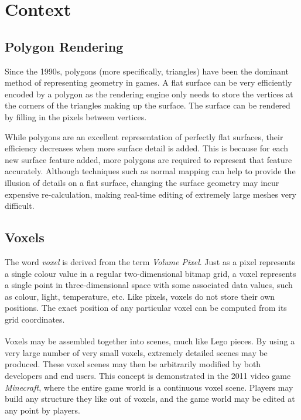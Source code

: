 \section{Context}
\subsection{Polygon Rendering}
Since the 1990s, polygons (more specifically, triangles) have been the dominant method of
representing geometry in games. A flat surface can be very efficiently
encoded by a polygon as the rendering engine only needs to store the vertices at the 
corners of the triangles making up the surface. The surface can be rendered by filling in
the pixels between vertices.

While polygons are an excellent representation of perfectly flat surfaces, their 
efficiency decreases when more surface detail is added. This is because for each new
surface feature added, more polygons are required to represent that feature accurately. 
Although techniques such as normal mapping can help to provide the illusion of details on
a flat surface, changing the surface geometry may incur expensive re-calculation, making real-time editing of extremely large meshes very difficult.

\subsection{Voxels}
The word \textit{voxel} is derived from the term \textit{Volume Pixel}. Just as a
pixel represents a single colour value in a regular two-dimensional bitmap grid, a 
voxel represents a single point in three-dimensional space with some associated data 
values, such as colour, light, temperature, etc. Like pixels, voxels do not store 
their own positions. The exact position of any particular voxel can be computed from
its grid coordinates. 

Voxels may be assembled together into scenes, much like 
Lego\textsuperscript{\textregistered} pieces. By using a very large number of very 
small voxels, extremely detailed scenes may be produced. These voxel scenes may then
be arbitrarily modified by both developers and end users. This concept is 
demonstrated in the 2011 video game \textit{Minecraft}, where the entire game world 
is a continuous voxel scene. Players may build any structure they like out of voxels, and
the game world may be edited at any point by players.

